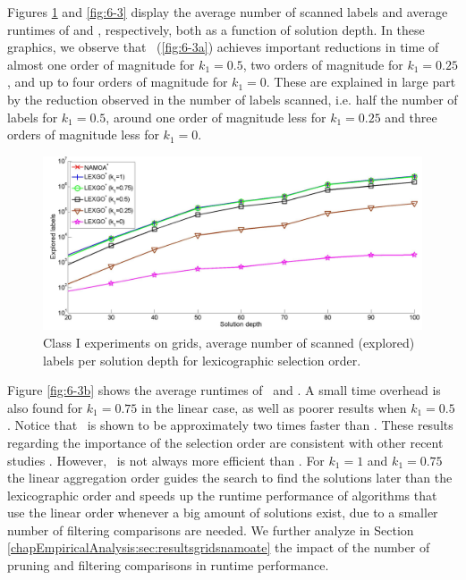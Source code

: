 Figures \ref{fig:6-2} and \ref{fig:6-3} display the average number of scanned labels and average runtimes of \lexgo and \namoa, respectively, both as a function of solution depth. In these graphics, we observe that \lexgolex \ (\ref{fig:6-3a}) achieves important reductions in time of almost one order of magnitude for $k_1=0.5$, two orders of magnitude for $k_1=0.25$, and up to four orders of magnitude for $k_1=0$. These are explained in large part by the reduction observed in the number of labels scanned, i.e. half the number of labels for $k_1=0.5$, around one order of magnitude less for $k_1=0.25$ and three orders of magnitude less for $k_1=0$. 

\begin{figure}%
\centering
\includegraphics[width=1\textwidth]{Images/Chapter6/class1-labels-lex}
\caption{Class I experiments on grids, average number of scanned (explored) labels per solution depth for lexicographic selection order.}
\label{fig:6-2}
\end{figure}

Figure \ref{fig:6-3b} shows the average runtimes of \lexgolin \ and \namoalin. A small time overhead is also found for $k_1=0.75$ in the linear case, as well as poorer results when $k_1=0.5$. Notice that \namoalin \ is shown to be approximately two times faster than \namoalex. These results regarding the importance of the selection order are consistent with other recent studies \citep{Machuca2011, Iori2010}. However, \lexgolin \ is not always more efficient than \lexgolex. For $k_1= 1$ and $k_1= 0.75$ the linear aggregation order guides the search to find the solutions later than the lexicographic order and speeds up the runtime performance of algorithms that use the linear order whenever a big amount of solutions exist, due to a smaller number of filtering comparisons are needed. We further analyze in Section \ref{chapEmpiricalAnalysis:sec:resultsgridsnamoate} the impact of the number of pruning and filtering comparisons in runtime performance.

